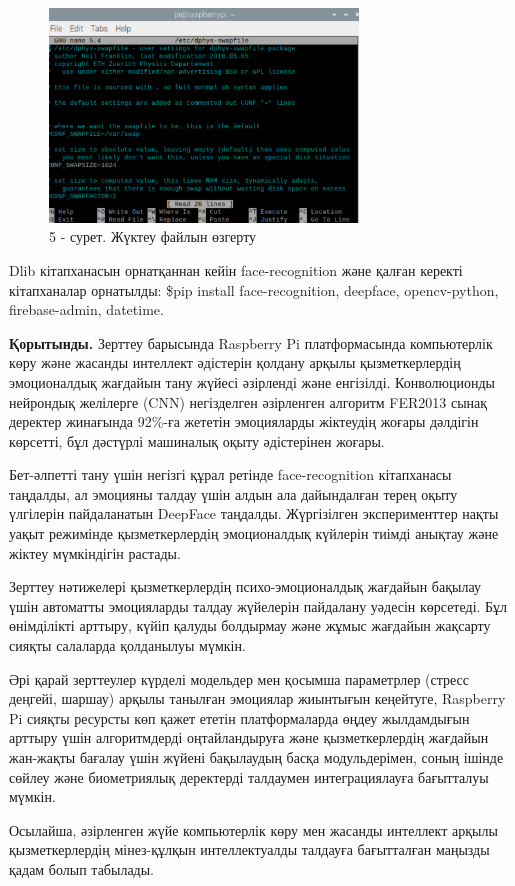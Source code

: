 \begin{figure}[H]
	\centering
	\includegraphics[width=0.73\textwidth]{media/ict2/image164}
	\caption*{5 - сурет. Жүктеу файлын өзгерту}
\end{figure}

\begin{multicols}{2}
Dlib кітапханасын орнатқаннан кейін face-recognition және қалған керекті
кітапханалар орнатылды: \$pip install face-recognition, deepface,
opencv-python, firebase-admin, datetime.

{\bfseries Қорытынды.} Зерттеу барысында Raspberry Pi платформасында
компьютерлік көру және жасанды интеллект әдістерін қолдану арқылы
қызметкерлердің эмоционалдық жағдайын тану жүйесі әзірленді және
енгізілді. Конволюционды нейрондық желілерге (CNN) негізделген
әзірленген алгоритм FER2013 сынақ деректер жинағында 92\%-ға жететін
эмоцияларды жіктеудің жоғары дәлдігін көрсетті, бұл дәстүрлі машиналық
оқыту әдістерінен жоғары.

Бет-әлпетті тану үшін негізгі құрал ретінде face-recognition кітапханасы
таңдалды, ал эмоцияны талдау үшін алдын ала дайындалған терең оқыту
үлгілерін пайдаланатын DeepFace таңдалды. Жүргізілген эксперименттер
нақты уақыт режимінде қызметкерлердің эмоционалдық күйлерін тиімді
анықтау және жіктеу мүмкіндігін растады.

Зерттеу нәтижелері қызметкерлердің психо-эмоционалдық жағдайын бақылау
үшін автоматты эмоцияларды талдау жүйелерін пайдалану уәдесін көрсетеді.
Бұл өнімділікті арттыру, күйіп қалуды болдырмау және жұмыс жағдайын
жақсарту сияқты салаларда қолданылуы мүмкін.

Әрі қарай зерттеулер күрделі модельдер мен қосымша параметрлер (стресс
деңгейі, шаршау) арқылы танылған эмоциялар жиынтығын кеңейтуге,
Raspberry Pi сияқты ресурсты көп қажет ететін платформаларда өңдеу
жылдамдығын арттыру үшін алгоритмдерді оңтайландыруға және
қызметкерлердің жағдайын жан-жақты бағалау үшін жүйені бақылаудың басқа
модульдерімен, соның ішінде сөйлеу және биометриялық деректерді
талдаумен интеграциялауға бағытталуы мүмкін.

Осылайша, әзірленген жүйе компьютерлік көру мен жасанды интеллект арқылы
қызметкерлердің мінез-құлқын интеллектуалды талдауға бағытталған маңызды
қадам болып табылады.
\end{multicols}

